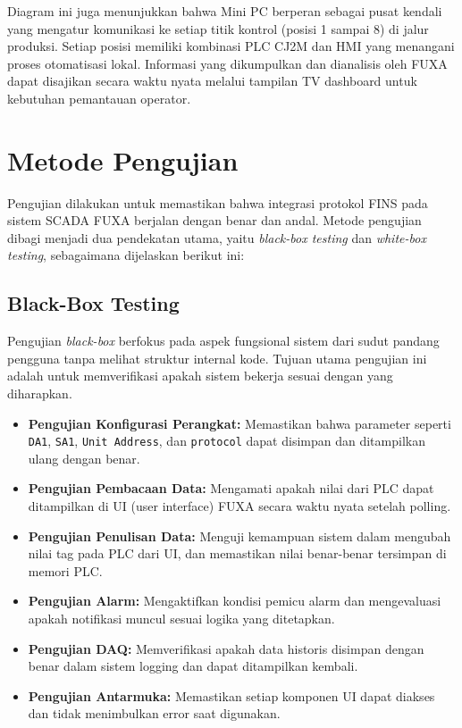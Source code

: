 Diagram ini juga menunjukkan bahwa Mini PC berperan sebagai pusat kendali yang mengatur komunikasi ke setiap titik kontrol (posisi 1 sampai 8) di jalur produksi. Setiap posisi memiliki kombinasi PLC CJ2M dan HMI yang menangani proses otomatisasi lokal. Informasi yang dikumpulkan dan dianalisis oleh FUXA dapat disajikan secara waktu nyata melalui tampilan TV dashboard untuk kebutuhan pemantauan operator.

\section{Metode Pengujian}

Pengujian dilakukan untuk memastikan bahwa integrasi protokol FINS pada sistem SCADA FUXA berjalan dengan benar dan andal. Metode pengujian dibagi menjadi dua pendekatan utama, yaitu \textit{black-box testing} dan \textit{white-box testing}, sebagaimana dijelaskan berikut ini:

\subsection{Black-Box Testing}

Pengujian \textit{black-box} berfokus pada aspek fungsional sistem dari sudut pandang pengguna tanpa melihat struktur internal kode. Tujuan utama pengujian ini adalah untuk memverifikasi apakah sistem bekerja sesuai dengan yang diharapkan.

\begin{itemize}
    \item \textbf{Pengujian Konfigurasi Perangkat:} Memastikan bahwa parameter seperti \texttt{DA1}, \texttt{SA1}, \texttt{Unit Address}, dan \texttt{protocol} dapat disimpan dan ditampilkan ulang dengan benar.
    \item \textbf{Pengujian Pembacaan Data:} Mengamati apakah nilai dari PLC dapat ditampilkan di UI (user interface) FUXA secara waktu nyata setelah polling.
    \item \textbf{Pengujian Penulisan Data:} Menguji kemampuan sistem dalam mengubah nilai tag pada PLC dari UI, dan memastikan nilai benar-benar tersimpan di memori PLC.
    \item \textbf{Pengujian Alarm:} Mengaktifkan kondisi pemicu alarm dan mengevaluasi apakah notifikasi muncul sesuai logika yang ditetapkan.
    \item \textbf{Pengujian DAQ:} Memverifikasi apakah data historis disimpan dengan benar dalam sistem logging dan dapat ditampilkan kembali.
    \item \textbf{Pengujian Antarmuka:} Memastikan setiap komponen UI dapat diakses dan tidak menimbulkan error saat digunakan.
\end{itemize}

